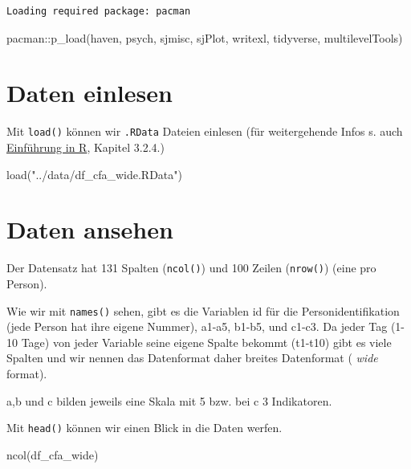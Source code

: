 \documentclass[
  letterpaper,
  DIV=11,
  numbers=noendperiod]{scrreprt}
\newenvironment{Shaded}{\begin{snugshade}}{\end{snugshade}}
\newcommand{\FunctionTok}[1]{\textcolor[rgb]{0.28,0.35,0.67}{#1}}
\newcommand{\NormalTok}[1]{\textcolor[rgb]{0.00,0.23,0.31}{#1}}
\newcommand{\SpecialCharTok}[1]{\textcolor[rgb]{0.37,0.37,0.37}{#1}}
\newcommand{\StringTok}[1]{\textcolor[rgb]{0.13,0.47,0.30}{#1}}
\begin{document}
\begin{verbatim}
Loading required package: pacman
\end{verbatim}

\begin{Shaded}
\begin{Highlighting}[]
\NormalTok{pacman}\SpecialCharTok{::}\FunctionTok{p\_load}\NormalTok{(haven, psych,}
\NormalTok{               sjmisc, sjPlot, writexl,}
\NormalTok{               tidyverse, multilevelTools)}
\end{Highlighting}
\end{Shaded}

\section{Daten einlesen}\label{daten-einlesen}

Mit \texttt{load()} können wir \texttt{.RData} Dateien einlesen (für
weitergehende Infos s. auch
\href{https://methodenlehre.github.io/einfuehrung-in-R/chapters/03-data_frames.html}{Einführung
in R}, Kapitel 3.2.4.)

\begin{Shaded}
\begin{Highlighting}[]
\FunctionTok{load}\NormalTok{(}\StringTok{"../data/df\_cfa\_wide.RData"}\NormalTok{)}
\end{Highlighting}
\end{Shaded}

\section{Daten ansehen}\label{daten-ansehen}

Der Datensatz hat 131 Spalten (\texttt{ncol()}) und 100 Zeilen
(\texttt{nrow()}) (eine pro Person).

Wie wir mit \texttt{names()} sehen, gibt es die Variablen id für die
Personidentifikation (jede Person hat ihre eigene Nummer), a1-a5, b1-b5,
und c1-c3. Da jeder Tag (1-10 Tage) von jeder Variable seine eigene
Spalte bekommt (t1-t10) gibt es viele Spalten und wir nennen das
Datenformat daher breites Datenformat ( \emph{wide} format).

a,b und c bilden jeweils eine Skala mit 5 bzw. bei c 3 Indikatoren.

Mit \texttt{head()} können wir einen Blick in die Daten werfen.

\begin{Shaded}
\begin{Highlighting}[]
\FunctionTok{ncol}\NormalTok{(df\_cfa\_wide)}
\end{Highlighting}
\end{Shaded}
\end{document}
